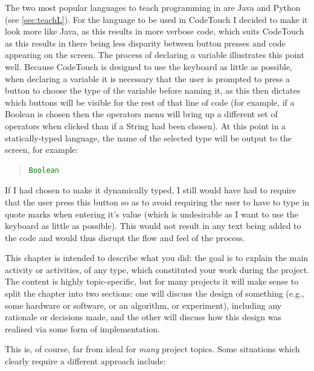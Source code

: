 \documentclass[ %
                    author={Jonathan Rankin},
                supervisor={Dr. David May, Dr. Ian Holyer},
                    degree={MEng},
                     title={CodeTouch},
                  subtitle={A Revolutionary Way To Program Real Code On Touch Screen Devices},
                      type={enterprise},
                      year={2015 } ]{dissertation}
\begin{document}
The two most popular languages to teach programming in are Java and Python (see \ref{sec:teachL}). For the language to be used in CodeTouch I decided to make it look more like Java, as this results in more verbose code, which suits CodeTouch as this results in there being less disparity between button presses and code appearing on the screen. The process of declaring a variable illustrates this point well. Because CodeTouch is designed to use the keyboard as little as possible, when declaring a variable it is necessary that the user is prompted to press a button to choose the type of the variable before naming it, as this then dictates which buttons will be visible for the rest of that line of code (for example, if a Boolean is chosen then the operators menu will bring up a different set of operators when clicked than if a String had been chosen). At this point in a statically-typed language, the name of the selected type will be output to the screen, for example:
 
\begin{quote}
\begin{lstlisting}[caption={Output when Boolean type is selected for variable declaration in Java},label={lst:javaDec},language=Java]
Boolean
\end{lstlisting}
\label{lst:label}
\end{quote}

If I had chosen to make it dynamically typed, I still would have had to require that the user press this button so as to avoid requiring the user to have to type in quote marks when entering it's value (which is undesirable as I want to use the keyboard as little as possible). This would not result in any text being added to the code and would thus disrupt the flow and feel of the process. 


\noindent
This chapter is intended to describe what you did: the goal is to explain
the main activity or activities, of any type, which constituted your work 
during the project.  The content is highly topic-specific, but for many 
projects it will make sense to split the chapter into two sections: one 
will discuss the design of something (e.g., some hardware or software, or 
an algorithm, or experiment), including any rationale or decisions made, 
and the other will discuss how this design was realised via some form of 
implementation.  

This is, of course, far from ideal for {\em many} project topics.  Some
situations which clearly require a different approach include:
\end{document}

